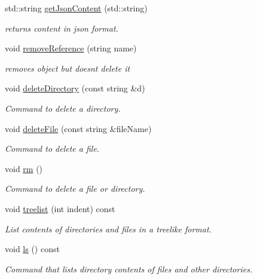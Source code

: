 \begin{DoxyCompactItemize}
\item 
std\+::string \hyperlink{class_directory_ad4b9f8d48a33526ac1c61dbce3753f1d}{get\+Json\+Content} (std\+::string)
\begin{DoxyCompactList}\small\item\em returns content in json format. \end{DoxyCompactList}\item 
void \hyperlink{class_directory_a87a23d283d18c5c2a521e2f2dbccb390}{remove\+Reference} (string name)
\begin{DoxyCompactList}\small\item\em removes object but doesnt delete it \end{DoxyCompactList}\item 
void \hyperlink{class_directory_a8d233286b4964b8261543fa823e66f9e}{delete\+Directory} (const string \&d)
\begin{DoxyCompactList}\small\item\em Command to delete a directory. \end{DoxyCompactList}\item 
void \hyperlink{class_directory_ac5d2847c135eff94ce4fedd8099de18a}{delete\+File} (const string \&file\+Name)
\begin{DoxyCompactList}\small\item\em Command to delete a file. \end{DoxyCompactList}\item 
void \hyperlink{class_directory_ad764e9b4d0568c0acf788a15e0621f1a}{rm} ()
\begin{DoxyCompactList}\small\item\em Command to delete a file or directory. \end{DoxyCompactList}\item 
void \hyperlink{class_directory_af21c038562a88b24df0cb6e0c361febd}{treelist} (int indent) const
\begin{DoxyCompactList}\small\item\em List contents of directories and files in a treelike format. \end{DoxyCompactList}\item 
void \hyperlink{class_directory_a97bf31f9a554ff687a410f735d8770dd}{ls} () const
\begin{DoxyCompactList}\small\item\em Command that lists directory contents of files and other directories. \end{DoxyCompactList}\item 

\end{DoxyCompactItemize}

